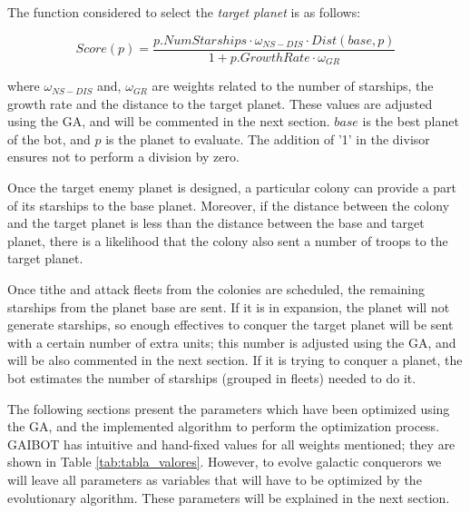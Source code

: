 \documentclass{llncs}
\begin{document}
The function considered to select the \textit{target planet} is as follows:

\begin{footnotesize}
\begin{equation} \label{eq:fitness_ga}
Score(p)= \frac {p.NumStarships \cdot \omega_{NS-DIS}\cdot Dist(base,p) } {1 + p.GrowthRate \cdot 
\omega_{GR} }
\end{equation}
\end{footnotesize}

\noindent where $\omega_{NS-DIS}$ and, $\omega_{GR}$ are weights related to the number of starships, the growth rate and the distance to the target planet. These values are adjusted using the GA, and will be commented in the next section. 
$base$ is the best planet of the bot, and $p$ is the planet to evaluate. The addition of '1' in the divisor ensures not to perform a division by zero.

Once the target enemy planet is designed, a particular colony can
provide a part of its starships to the base planet.
Moreover, if the distance between the colony and the target planet is less than the distance between the base and target planet, there is a likelihood that the colony also sent a number of troops to the target planet. 


Once tithe and attack fleets from the colonies are scheduled, the remaining starships from the planet base are sent. 
If it is in expansion, the planet will not generate starships, so
enough effectives to conquer the target planet will be sent with a
certain number of extra units; this number is adjusted using the GA, and will be also commented in the next section. 
If it is trying to conquer a planet, the bot estimates the number of starships (grouped in fleets) needed to do it.

The following sections present the parameters which have been optimized
using the GA, and the implemented algorithm to perform the optimization
process. GAIBOT has intuitive and hand-fixed values for all weights
mentioned; they are shown in Table \ref{tab:tabla_valores}. However, to evolve
galactic conquerors we will leave all parameters as variables that will
have to be optimized by the evolutionary algorithm. These parameters
will be explained in the next section. 
\end{document}
